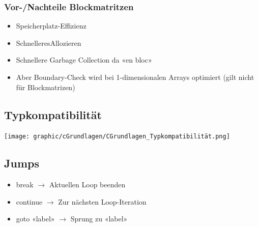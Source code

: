 \subsubsection{Vor-/Nachteile Blockmatritzen}
\begin{itemize}
    \item Speicherplatz-Effizienz
    \item SchnelleresAllozieren
    \item Schnellere Garbage Collection da «en bloc»
    \item Aber Boundary-Check wird bei 1-dimensionalen Arrays optimiert (gilt nicht für Blockmatrizen)
\end{itemize}

\subsection{Typkompatibilität}
\begin{center}
    \texttt{[image: graphic/cGrundlagen/CGrundlagen\_Typkompatibilität.png]}
\end{center}
\vspace{-8pt}

\subsection{Jumps}
\begin{itemize}
    \item break $\rightarrow$ Aktuellen Loop beenden
    \item continue $\rightarrow$ Zur nächsten Loop-Iteration
    \item goto «label» $\rightarrow$ Sprung zu «label»
\end{itemize}

\newpage